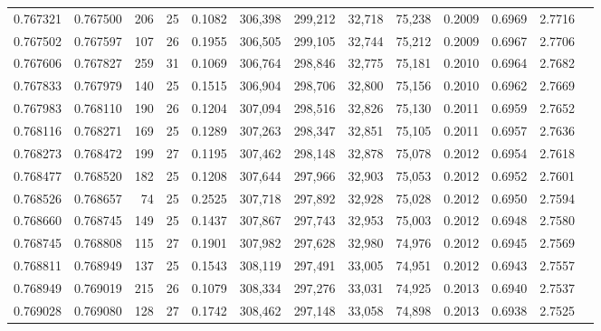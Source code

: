 \begin{tabular}{rrrrrrrrrrrrr}
0.767321 & 0.767500 &   206 &  25 &                                     0.1082 & 306,398 & 299,212 &  32,718 &  75,238 & 0.2009 & 0.6969 & 2.7716 \\
0.767502 & 0.767597 &   107 &  26 &                                     0.1955 & 306,505 & 299,105 &  32,744 &  75,212 & 0.2009 & 0.6967 & 2.7706 \\
0.767606 & 0.767827 &   259 &  31 &                                     0.1069 & 306,764 & 298,846 &  32,775 &  75,181 & 0.2010 & 0.6964 & 2.7682 \\
0.767833 & 0.767979 &   140 &  25 &                                     0.1515 & 306,904 & 298,706 &  32,800 &  75,156 & 0.2010 & 0.6962 & 2.7669 \\
0.767983 & 0.768110 &   190 &  26 &                                     0.1204 & 307,094 & 298,516 &  32,826 &  75,130 & 0.2011 & 0.6959 & 2.7652 \\
0.768116 & 0.768271 &   169 &  25 &                                     0.1289 & 307,263 & 298,347 &  32,851 &  75,105 & 0.2011 & 0.6957 & 2.7636 \\
0.768273 & 0.768472 &   199 &  27 &                                     0.1195 & 307,462 & 298,148 &  32,878 &  75,078 & 0.2012 & 0.6954 & 2.7618 \\
0.768477 & 0.768520 &   182 &  25 &                                     0.1208 & 307,644 & 297,966 &  32,903 &  75,053 & 0.2012 & 0.6952 & 2.7601 \\
0.768526 & 0.768657 &    74 &  25 &                                     0.2525 & 307,718 & 297,892 &  32,928 &  75,028 & 0.2012 & 0.6950 & 2.7594 \\
0.768660 & 0.768745 &   149 &  25 &                                     0.1437 & 307,867 & 297,743 &  32,953 &  75,003 & 0.2012 & 0.6948 & 2.7580 \\
0.768745 & 0.768808 &   115 &  27 &                                     0.1901 & 307,982 & 297,628 &  32,980 &  74,976 & 0.2012 & 0.6945 & 2.7569 \\
0.768811 & 0.768949 &   137 &  25 &                                     0.1543 & 308,119 & 297,491 &  33,005 &  74,951 & 0.2012 & 0.6943 & 2.7557 \\
0.768949 & 0.769019 &   215 &  26 &                                     0.1079 & 308,334 & 297,276 &  33,031 &  74,925 & 0.2013 & 0.6940 & 2.7537 \\
0.769028 & 0.769080 &   128 &  27 &                                     0.1742 & 308,462 & 297,148 &  33,058 &  74,898 & 0.2013 & 0.6938 & 2.7525 \\

\end{tabular}
